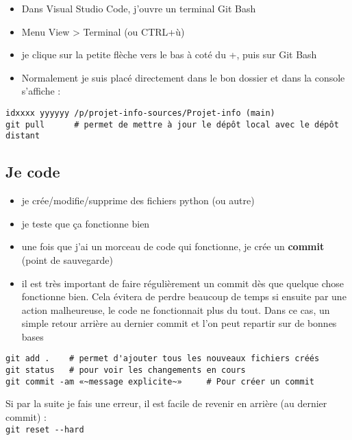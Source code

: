 \documentclass[11pt]{article}
\begin{document}
\begin{itemize}
    \item Dans Visual Studio Code, j'ouvre un terminal Git Bash
    \item Menu View > Terminal (ou CTRL+ù)
    \item je clique sur la petite flèche vers le bas à coté du +, puis sur Git Bash
    \item Normalement je suis placé directement dans le bon dossier et dans la console s'affiche : 
\end{itemize}


\noindent
\verb"idxxxx yyyyyy /p/projet-info-sources/Projet-info (main)" \\
\verb"git pull      # permet de mettre à jour le dépôt local avec le dépôt distant"




\subsection*{Je code}

\begin{itemize}
    \item je crée/modifie/supprime des fichiers python (ou autre)
    \item je teste que ça fonctionne bien
    \item une fois que j'ai un morceau de code qui fonctionne, je crée un \textbf{commit} (point de sauvegarde)
    \item il est très important de faire régulièrement un commit dès que quelque chose fonctionne bien. Cela évitera de perdre beaucoup de temps si ensuite par une action malheureuse, le code ne fonctionnait plus du tout. Dans ce cas, un simple retour arrière au dernier commit et l'on peut repartir sur de bonnes bases
\end{itemize}

\noindent
\verb"git add .    # permet d'ajouter tous les nouveaux fichiers créés" \\
\verb"git status   # pour voir les changements en cours" \\
\verb"git commit -am «~message explicite~»     # Pour créer un commit" \\

\bigbreak

Si par la suite je fais une erreur, il est facile de revenir en arrière (au dernier commit) :\\
\verb"git reset --hard" 

\bigbreak
\end{document}
